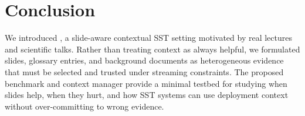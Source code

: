 \section{Conclusion}

We introduced \taskname, a slide-aware contextual SST setting motivated by real lectures and scientific talks.  Rather than treating context as always helpful, we formulated slides, glossary entries, and background documents as heterogeneous evidence that must be selected and trusted under streaming constraints.  The proposed \datasetname{} benchmark and \policyname{} context manager provide a minimal testbed for studying when slides help, when they hurt, and how SST systems can use deployment context without over-committing to wrong evidence.
